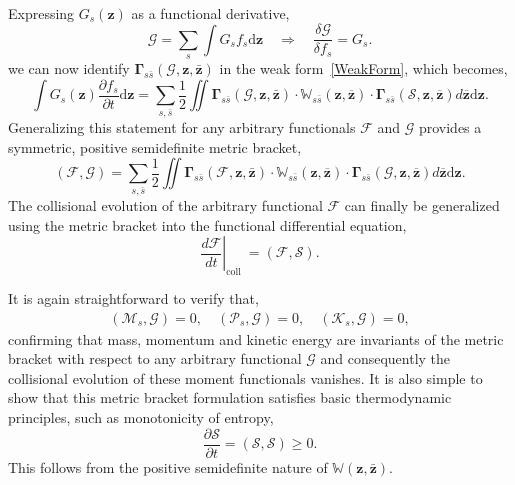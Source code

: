\documentclass[preprint,12pt]{elsarticle}
\theoremstyle{definition}
\begin{document}
Expressing $G_s (\boldsymbol{z})$ as a functional derivative,
\begin{equation}
\mathcal{G}=\sum_{s} \int G_{s} f_{s} \mathrm{d} \boldsymbol{z} \quad \Longrightarrow \quad \frac{\delta \mathcal{G}}{\delta f_{s}}=G_{s}.
\end{equation}
we can now identify $\boldsymbol{\Gamma}_{s \bar{s}} (\mathcal{G}, \boldsymbol{z}, \boldsymbol{\bar{z}})$ in the weak form~\eqref{WeakForm}, which becomes,
\begin{equation}
\int G_s (\boldsymbol{z}) \frac{\partial f_s}{\partial t} \mathrm{d} \boldsymbol{z} = \sum_{s, \bar{s}} \frac{1}{2} \iint \boldsymbol{\Gamma}_{s \bar{s}} (\mathcal{G}, \boldsymbol{z}, \boldsymbol{\bar{z}}) \cdot \mathbb{W}_{s \bar{s}}(\boldsymbol{z}, \overline{\boldsymbol{z}}) \cdot \boldsymbol{\Gamma}_{s \bar{s}}(\mathcal{S}, \boldsymbol{z}, \overline{\boldsymbol{z}}) d \overline{\boldsymbol{z}} \mathrm{d} \boldsymbol{z}.
\end{equation}
Generalizing this statement for any arbitrary functionals $\mathcal{F}$ and $\mathcal{G}$ provides a symmetric, positive semidefinite metric bracket,
\begin{equation}
(\mathcal{F}, \mathcal{G})= \sum_{s, \bar{s}} \frac{1}{2} \iint \boldsymbol{\Gamma}_{s \bar{s}} (\mathcal{F}, \boldsymbol{z}, \boldsymbol{\bar{z}}) \cdot \mathbb{W}_{s \bar{s}}(\boldsymbol{z}, \overline{\boldsymbol{z}}) \cdot \boldsymbol{\Gamma}_{s \bar{s}}(\mathcal{G}, \boldsymbol{z}, \overline{\boldsymbol{z}}) d \overline{\boldsymbol{z}} \mathrm{d} \boldsymbol{z}.
\label{MetricBracket}
\end{equation}
The collisional evolution of the arbitrary functional $\mathcal{F}$ can finally be generalized using the metric bracket into the functional differential equation,
\begin{equation}
\left.\frac{d \mathcal{F}}{d t}\right|_{\text {coll }}=\left(\mathcal{F}, \mathcal{S}\right).
\label{ColEvo}
\end{equation}

It is again straightforward to verify that,
\begin{align*}
\left( \mathcal{M}_{s} , \mathcal{G} \right) = 0, \quad \left( \mathcal{P}_{s} , \mathcal{G} \right) = 0, \quad \left( \mathcal{K}_{s} , \mathcal{G} \right) = 0,
\end{align*}
confirming that mass, momentum and kinetic energy are invariants of the metric bracket with respect to any arbitrary functional $\mathcal{G}$ and consequently the collisional evolution of these moment functionals vanishes. It is also simple to show that this metric bracket formulation satisfies basic thermodynamic principles, such as monotonicity of entropy,
\begin{equation}
\frac{\partial \mathcal{S}}{\partial t} = \left( \mathcal{S}, \mathcal{S} \right) \geq 0.
\end{equation}
This follows from the positive semidefinite nature of $\mathbb{W} (\boldsymbol{z}, \boldsymbol{\bar{z}})$. 
\end{document}
